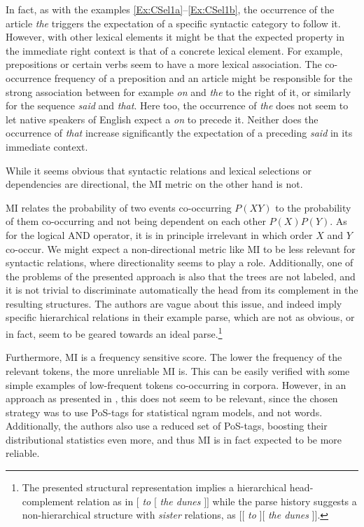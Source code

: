 \documentclass[11pt,a4paper,english]{article}
\begin{document}
In fact, as with the examples \ref{Ex:CSel1a}--\ref{Ex:CSel1b}, the occurrence of the article \textit{the} triggers the expectation of a specific syntactic category to follow it. However, with other lexical elements it might be that the expected property in the immediate right context is that of a concrete lexical element. For example, prepositions or certain verbs seem to have a more lexical association. The co-occurrence frequency of a preposition and an article might be responsible for the strong association between for example \textit{on} and \textit{the} to the right of it, or similarly for the sequence \textit{said} and \textit{that}. Here too, the occurrence of \textit{the} does not seem to let native speakers of English expect a \textit{on} to precede it. Neither does the occurrence of \textit{that} increase significantly the expectation of a preceding \textit{said} in its immediate context.

While it seems obvious that syntactic relations and lexical selections or dependencies are directional, the MI metric on the other hand is not.

MI relates the probability of two events co-occurring $P(XY)$ to the probability of them co-occurring and not being dependent on each other $P(X)P(Y)$. As for the logical AND operator, it is in principle irrelevant in which order $X$ and $Y$ co-occur. We might expect a non-directional metric like MI to be less relevant for syntactic relations, where directionality seems to play a role. Additionally, one of the problems of the presented approach is also that the trees are not labeled, and it is not trivial to discriminate automatically the head from its complement in the resulting structures. The authors are vague about this issue, and indeed imply specific hierarchical relations in their example parse, which are not as obvious, or in fact, seem to be geared towards an ideal parse.\footnote{The presented structural representation implies a hierarchical head-complement relation as in $[$ \textit{to} $[$ \textit{the dunes} $] ]$ while the parse history suggests a non-hierarchical structure with \textit{sister} relations, as $[ [$ \textit{to} $] [$ \textit{the dunes} $] ]$.}

Furthermore, MI is a frequency sensitive score. The lower the frequency of the relevant tokens, the more unreliable MI is. This can be easily verified with some simple examples of low-frequent tokens co-occurring in corpora. However, in an approach as presented in \cite{Magerman:Marcus:1990}, this does not seem to be relevant, since the chosen strategy was to use PoS-tags for statistical ngram models, and not words. Additionally, the authors also use a reduced set of PoS-tags, boosting their distributional statistics even more, and thus MI is in fact expected to be more reliable.
\end{document}
